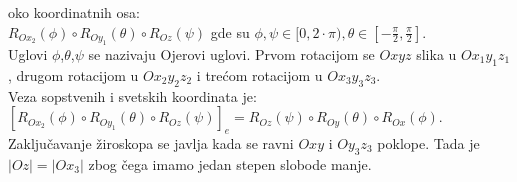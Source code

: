 \documentclass[12pt]{article}
\begin{document}
oko koordinatnih osa:\\
$R_{Ox_2}(\phi)\circ R_{Oy_1}(\theta)\circ R_{Oz}(\psi)$ gde su $\phi,\psi\in[0,2\cdot\pi),\theta\in[-\frac{\pi}{2},\frac{\pi}{2}]$.\\
            Uglovi $\phi$,$\theta$,$\psi$ se nazivaju Ojerovi uglovi. Prvom rotacijom se $Oxyz$ slika u $Ox_1y_1z_1$,
            drugom rotacijom u $Ox_2y_2z_2$ i trećom rotacijom u $Ox_3y_3z_3$.\\
            Veza sopstvenih i svetskih koordinata je:\\
        $[R_{Ox_2}(\phi)\circ R_{Oy_1}(\theta)\circ R_{Oz}(\psi)]_e = R_{Oz}(\psi)\circ R_{Oy}(\theta)\circ R_{Ox}(\phi)$.\\
            Zaključavanje žiroskopa se javlja kada se ravni $Oxy$ i $Oy_3z_3$ poklope. Tada
            je $|Oz|=|Ox_3|$ zbog čega imamo jedan stepen slobode manje.
        \par
\end{document}
